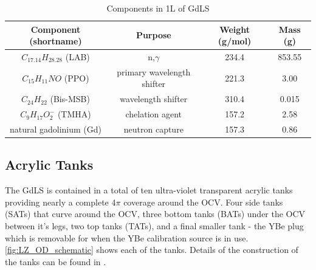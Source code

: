 \begin{table}[!htbp]
    \centering
    \begin{tabular}{c | c | c | c}
    \hline
    {Component (shortname)} & {Purpose} & {Weight (g/mol)} & {Mass (g)} \\ \hline
    $C_{17.14}H_{28.28}$ (LAB) & n,$\gamma$ & 234.4  & 853.55 \\
    $C_{15}H_{11}NO$ (PPO) & primary wavelength shifter & 221.3 & 3.00 \\
    $C_{24}H_{22}$ (Bis-MSB) & wavelength shifter & 310.4 & 0.015 \\
    $C_{9}H_{17}O^{-}_{2}$ (TMHA) & chelation agent & 157.2 & 2.58 \\
    natural gadolinium (Gd) & neutron capture & 157.3 & 0.86 
    \end{tabular}
    \caption{Components in 1L of GdLS}
    \label{tab:GdLS_Components}
\end{table} 


\subsection{Acrylic Tanks}
\par
The GdLS is contained in a total of ten ultra-violet transparent acrylic tanks providing nearly a complete 4$\pi$ coverage around the OCV.
Four side tanks (SATs) that curve around the OCV, three bottom tanks (BATs) under the OCV between it's legs, two top tanks (TATs), and a final smaller tank - the YBe plug which is removable for when the YBe calibration source is in use.
\autoref{fig:LZ_OD_schematic} shows each of the tanks.
Details of the construction of the tanks can be found in \cite{scotthaselschwardt_thesis_ref}.

